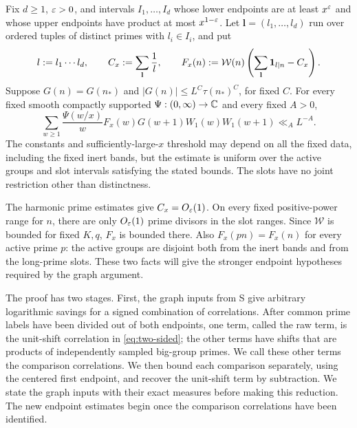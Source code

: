 \begin{theorem}\label{thm:two-sided}
Fix $d\geq1$, $\varepsilon>0$, and intervals $I_1,\ldots,I_d$ whose lower
endpoints are at least $x^\varepsilon$ and whose upper endpoints have product
at most $x^{1-\varepsilon}$.  Let $\mathbf l=(l_1,\ldots,l_d)$ run over
ordered tuples of distinct primes with $l_i\in I_i$, and put
\begin{equation}\label{cor:centered-core}
 l:=l_1\cdots l_d,\qquad
 C_x:=\sum_{\mathbf l}\frac1l,\qquad
 F_x(n):=\mathcal W(n)
       \left(\sum_{\mathbf l}\mathbf{1}_{l\mid n}-C_x\right).
\end{equation}
Suppose $G(n)=G(n_*)$ and
$|G(n)|\leq L^C\tau(n_*)^C$, for fixed $C$.  For every fixed smooth
compactly supported $\Psi:(0,\infty)\to\mathbb C$ and every fixed $A>0$,
\begin{equation}\label{eq:two-sided}
 \sum_{w\geq1}\frac{\Psi(w/x)}w
       F_x(w)G(w+1)W_1(w)W_1(w+1)\ll_A L^{-A}.
\end{equation}
The constants and sufficiently-large-$x$ threshold may depend on all
the fixed data, including the fixed inert bands, but the estimate is
uniform over the active groups and slot intervals satisfying the stated
bounds.  The slots have no joint restriction other than distinctness.
\end{theorem}

The harmonic prime estimates give $C_x=O_\varepsilon(1)$.  On every fixed
positive-power range for $n$, there are only $O_\varepsilon(1)$ prime divisors
in the slot ranges.  Since $\mathcal W$ is bounded for fixed $K,q$,
$F_x$ is bounded there.  Also $F_x(pn)=F_x(n)$ for every active prime
$p$: the active groups are disjoint both from the inert bands and from
the long-prime slots.  These two facts will give the stronger endpoint
hypotheses required by the graph argument.

The proof has two stages.  First, the graph inputs from S give
arbitrary logarithmic savings for a signed combination of correlations.
After common prime labels have been divided out of both endpoints,
one term, called the raw term, is the unit-shift correlation
in \eqref{eq:two-sided}; the other terms have shifts that are products
of independently sampled big-group primes.  We call these other terms
the comparison correlations.  We then bound each comparison separately,
using the centered first endpoint, and recover the unit-shift term by
subtraction.  We state the graph inputs with their exact measures before
making this reduction.  The new endpoint estimates begin once the
comparison correlations have been identified.

